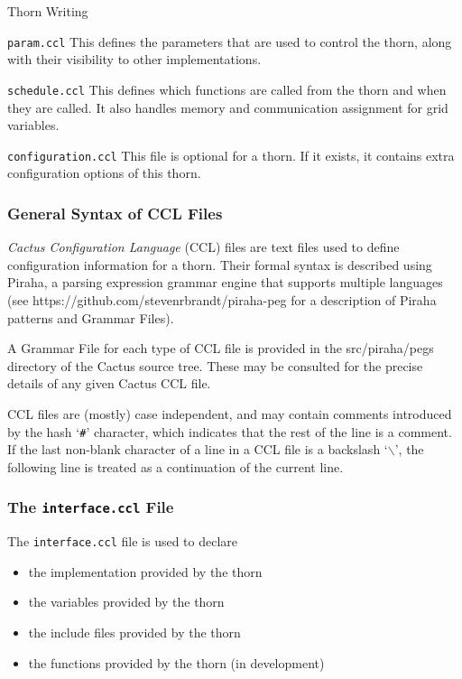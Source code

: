 \begin{cactuspart}{Thorn Writing}
\begin{Lentry}
\item [\texttt{param.ccl}]
This defines the parameters that are used to control the thorn, along
with their visibility to other implementations.

\item [\texttt{schedule.ccl}]
This defines which functions are called from the thorn and when they are
called. It also handles memory and communication assignment for grid variables.

\item [\texttt{configuration.ccl}]
This file is optional for a thorn. If it exists, it contains extra
configuration options of this thorn.

\end{Lentry}

\subsubsection{General Syntax of CCL Files}

\textit{Cactus Configuration Language} (CCL) files are text files
used to define configuration information for a thorn. Their formal
syntax is described using Piraha, a parsing expression grammar engine
that supports multiple languages (see https://github.com/stevenrbrandt/piraha-peg
for a description of Piraha patterns and Grammar Files).

A Grammar File for each type of CCL file is provided in the src/piraha/pegs
directory of the Cactus source tree. These may be consulted for the precise
details of any given Cactus CCL file.

CCL files are
(mostly) case independent, and may contain comments introduced by the hash `\texttt{\#}'
character, which indicates that the rest of the line is a comment. If the last
non-blank character of a line in a CCL file is a backslash
`\texttt{$\backslash$}', the
following line is treated as a continuation of the current line.

\subsubsection{The \texttt{interface.ccl} File}
\label{subsec:interface_ccl}

The \texttt{interface.ccl} file is used to declare

\begin{itemize}
\item the implementation provided by the thorn
\item the variables provided by the thorn
\item the include files provided by the thorn
\item the functions provided by the thorn (in development)
\end{itemize}



\end{cactuspart}
